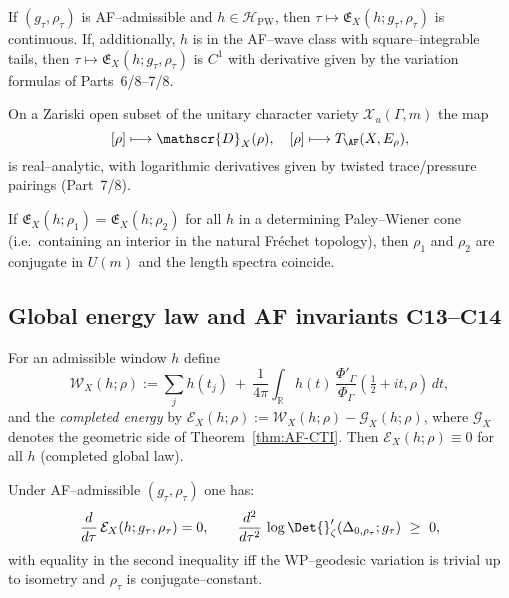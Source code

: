 \begin{proposition}
\label{prop:cont}
If $(g_\tau,\rho_\tau)$ is AF–admissible and $h\in\mathcal{H}_{\mathrm{PW}}$, then $\tau\mapsto \mathfrak{E}_X(h;g_\tau,\rho_\tau)$ is continuous. If, additionally, $h$ is in the AF–wave class with square–integrable tails, then $\tau\mapsto \mathfrak{E}_X(h;g_\tau,\rho_\tau)$ is $C^1$ with derivative given by the variation formulas of Parts~6/8–7/8.
\end{proposition}

\begin{theorem}
\label{thm:analytic-rep}
On a Zariski open subset of the unitary character variety $\mathcal{X}_u(\Gamma,m)$ the map
\[
[\rho]\longmapsto \mathscr{D}_X(\rho),\quad
[\rho]\longmapsto T_{\AF}(X,E_\rho),
\]
is real–analytic, with logarithmic derivatives given by twisted trace/pressure pairings (Part~7/8). %
\end{theorem}

\begin{theorem}
\label{thm:unique-family}
If $\mathfrak{E}_X(h;\rho_1)=\mathfrak{E}_X(h;\rho_2)$ for all $h$ in a determining Paley–Wiener cone (i.e.\ containing an interior in the natural Fr\'echet topology), then $\rho_1$ and $\rho_2$ are conjugate in $U(m)$ and the length spectra coincide.
\end{theorem}

\subsection{Global energy law and AF invariants $\mathbf{C13}$–$\mathbf{C14}$}
\label{subsec:af-energy-law}
\relax\hspace{0pt}

\begin{definition}
\label{def:energy}
For an admissible window $h$ define
\[
\mathcal{W}_X(h;\rho):=\sum_j h(t_j)\ +\ \frac{1}{4\pi}\int_{\mathbb{R}} h(t)\,\frac{\Phi'_\Gamma}{\Phi_\Gamma}\!\left(\tfrac12+it,\rho\right)\,dt,
\]
and the \emph{completed energy} by $\mathcal{E}_X(h;\rho):=\mathcal{W}_X(h;\rho)-\mathcal{G}_X(h;\rho)$, where $\mathcal{G}_X$ denotes the geometric side of Theorem~\ref{thm:AF-CTI}. Then $\mathcal{E}_X(h;\rho)\equiv 0$ for all $h$ (completed global law).
\end{definition}

\begin{theorem}
\label{thm:conserve-convex}
Under AF–admissible $(g_\tau,\rho_\tau)$ one has:
\[
\frac{d}{d\tau}\,\mathcal{E}_X(h;g_\tau,\rho_\tau)=0, \qquad
\frac{d^2}{d\tau^2}\,\log \Det{}'_\zeta(\Delta_{0,\rho_\tau};g_\tau)\ \ge\ 0,
\]
with equality in the second inequality iff the WP–geodesic variation is trivial up to isometry and $\rho_\tau$ is conjugate–constant.
\end{theorem}

